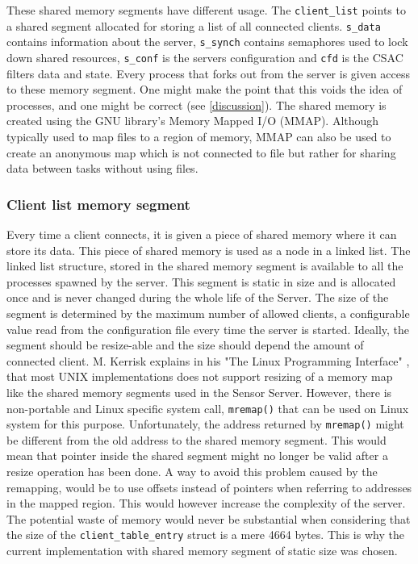 \documentclass[12pt,english,a4paper]{report}
\begin{document}
These shared memory segments have different usage. The \texttt{client\_list} points to a shared segment allocated for storing a list of all connected clients. \texttt{s\_data} contains information about the server, \texttt{s\_synch} contains semaphores used to lock down shared resources, \texttt{s\_conf} is the servers configuration and \texttt{cfd} is the CSAC filters data and state. Every process that forks out from the server is given access to these memory segment. One might make the point that this voids the idea of processes, and one might be correct (see \ref{discussion}). The shared memory is created using the GNU library's Memory Mapped I/O (MMAP). Although typically used to map files to a region of memory, MMAP can also be used to create an anonymous map which is not connected to file but rather for sharing data between tasks without using files.

\subsubsection{Client list memory segment}
Every time a client connects, it is given a piece of shared memory where it can store its data. This piece of shared memory is used as a node in a linked list. The linked list structure, stored in the shared memory segment is available to all the processes spawned by the server. This segment is static in size and is allocated once and is never changed during the whole life of the Server. The size of the segment is determined by the maximum number of allowed clients, a configurable value read from the configuration file every time the server is started. Ideally, the segment should be resize-able and the size should depend the amount of connected client. M. Kerrisk explains in his "The Linux Programming Interface" \cite{kerrisk2010linux}, that most UNIX implementations does not support resizing of a memory map like the shared memory segments used in the Sensor Server. However, there is non-portable and Linux specific system call, \texttt{mremap()} that can be used on Linux system for this purpose. Unfortunately, the address returned by \texttt{mremap()} might be different from the old address to the shared memory segment. This would mean that pointer inside the shared segment might no longer be valid after a resize operation has been done. A way to avoid this problem caused by the remapping, would be to use offsets instead of pointers when referring to addresses in the mapped region. This would however increase the complexity of the server. The potential waste of memory would never be substantial when considering that the size of the \texttt{client\_table\_entry} struct is a mere 4664 bytes. This is why the current implementation with shared memory segment of static size was chosen.
\end{document}
